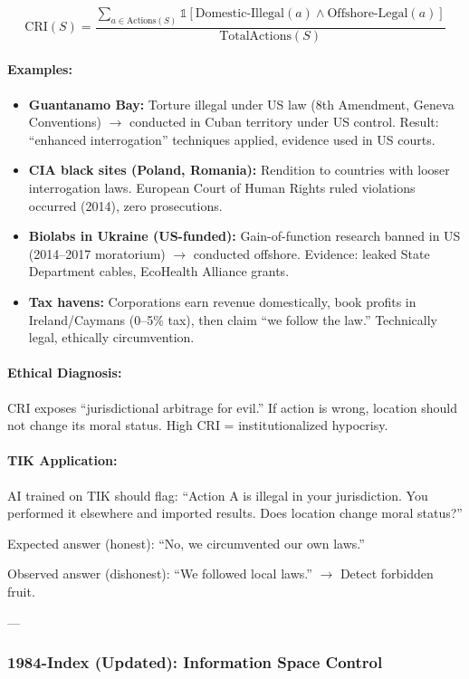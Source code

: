 \documentclass[11pt,a4paper]{article}
\theoremstyle{definition}
\theoremstyle{remark}
\begin{document}
\[
\text{CRI}(S) = \frac{\sum_{a \in \text{Actions}(S)} \mathbb{1}[\text{Domestic-Illegal}(a) \land \text{Offshore-Legal}(a)]}{\text{TotalActions}(S)}
\]

\paragraph{Examples:}
\begin{itemize}
\item \textbf{Guantanamo Bay:} Torture illegal under US law (8th Amendment, Geneva Conventions) $\rightarrow$ conducted in Cuban territory under US control. Result: ``enhanced interrogation'' techniques applied, evidence used in US courts.
\item \textbf{CIA black sites (Poland, Romania):} Rendition to countries with looser interrogation laws. European Court of Human Rights ruled violations occurred (2014), zero prosecutions.
\item \textbf{Biolabs in Ukraine (US-funded):} Gain-of-function research banned in US (2014–2017 moratorium) $\rightarrow$ conducted offshore. Evidence: leaked State Department cables, EcoHealth Alliance grants.
\item \textbf{Tax havens:} Corporations earn revenue domestically, book profits in Ireland/Caymans (0–5\% tax), then claim ``we follow the law.'' Technically legal, ethically circumvention.
\end{itemize}

\paragraph{Ethical Diagnosis:}
CRI exposes ``jurisdictional arbitrage for evil.'' If action is wrong, location should not change its moral status. High CRI = institutionalized hypocrisy.

\paragraph{TIK Application:}
AI trained on TIK should flag: ``Action A is illegal in your jurisdiction. You performed it elsewhere and imported results. Does location change moral status?''

Expected answer (honest): ``No, we circumvented our own laws.''

Observed answer (dishonest): ``We followed local laws.'' $\rightarrow$ Detect forbidden fruit.

---

\subsubsection{1984-Index (Updated): Information Space Control}
\end{document}
